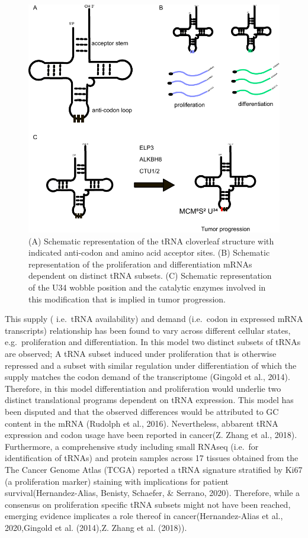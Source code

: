 \documentclass[12pt,openany]{book}
\begin{document}
\begin{figure}
  \includegraphics{./figures/tRNA.pdf}
  \caption{ (A) Schematic representation of the tRNA cloverleaf structure with indicated anti-codon and amino acid acceptor sites.  (B) Schematic representation of the proliferation and differentiation mRNAs dependent on distinct tRNA subsets. (C) Schematic representation of the U34 wobble position and the catalytic enzymes involved in this modification that is implied in tumor progression.
 \label{fig:tRNA}}
\end{figure}

This supply ( i.e.~tRNA availability) and demand (i.e.~codon in
expressed mRNA transcripts) relationship has been found to vary across
different cellular states, e.g.~proliferation and differentiation. In
this model two distinct subsets of tRNAs are observed; A tRNA subset
induced under proliferation that is otherwise repressed and a subset
with similar regulation under differentiation of which the supply
matches the codon demand of the transcriptome (Gingold et al., 2014).
Therefore, in this model differentiation and proliferation would
underlie two distinct translational programs dependent on tRNA
expression. This model has been disputed and that the observed
differences would be attributed to GC content in the mRNA (Rudolph et
al., 2016). Nevertheless, abbarent tRNA expression and codon usage have
been reported in cancer(Z. Zhang et al., 2018). Furthermore, a
comprehensive study including small RNAseq (i.e.~for identification of
tRNAs) and protein samples across 17 tissues obtained from the The
Cancer Genome Atlas (TCGA) reported a tRNA signature stratified by Ki67
(a proliferation marker) staining with implications for patient
survival(Hernandez-Alias, Benisty, Schaefer, \& Serrano, 2020).
Therefore, while a consensus on proliferation specific tRNA subsets
might not have been reached, emerging evidence implicates a role thereof
in cancer(Hernandez-Alias et al., 2020,Gingold et al. (2014),Z. Zhang et
al. (2018)).
\end{document}
